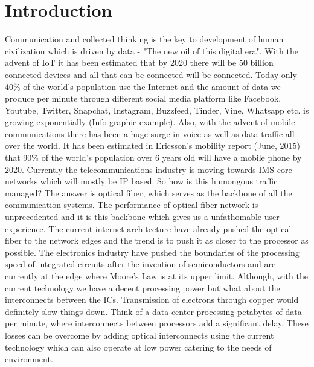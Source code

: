 \documentclass[../main.tex]{subfiles}
\begin{document}
	
	
\chapter{Introduction}
Communication and collected thinking is the key to development of human civilization which is driven by data - "The new oil of this digital era". With the advent of IoT it has been estimated that by 2020 there will be 50 billion connected devices and all that can be connected will be connected. Today only 40\% of the world's population use the Internet and the amount of data we produce per minute through different social media platform like Facebook, Youtube, Twitter, Snapchat, Instagram, Buzzfeed, Tinder, Vine, Whatsapp etc. is growing exponentially (Info-graphic example). Also, with the advent of mobile communications there has been a huge surge in voice as well as data traffic all over the world. It has been estimated in Ericsson's mobility report (June, 2015) that 90\% of the world’s population over 6 years old will have a mobile phone by 2020. Currently the telecommunications industry is moving towards IMS core networks which will mostly be IP based. So how is this humongous traffic managed? The answer is optical fiber, which serves as the backbone of all the communication systems. The performance of optical fiber network is unprecedented and it is this backbone which gives us a unfathomable user experience. The current internet architecture have already pushed the optical fiber to the network edges and the trend is to push it as closer to the processor as possible. The electronics industry have pushed the boundaries of the processing speed of integrated circuits after the invention of semiconductors and are currently at the edge where Moore's Law is at its upper limit. Although, with the current technology we have a decent processing power but what about the interconnects between the ICs. Transmission of electrons through copper would definitely slow things down. Think of a data-center processing petabytes of data per minute, where interconnects between processors add a significant delay. These losses can be overcome by adding optical interconnects using the current technology which can also operate at low power catering to the needs of environment.  
	
\end{document}

